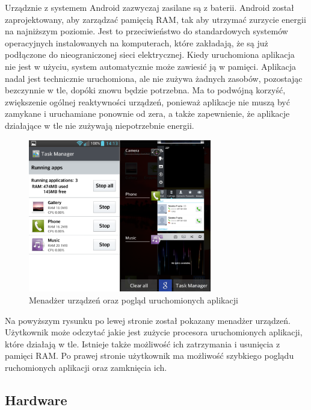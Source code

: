 Urządznie z systemem Android zazwyczaj zasilane są z baterii. Android został zaprojektowany, aby zarządzać pamięcią RAM, tak aby utrzymać zurzycie energii na najniższym poziomie. Jest to przeciwieństwo do standardowych systemów operacyjnych instalowanych na komputerach, które zakładają, że są już podłączone do nieograniczonej sieci elektrycznej. Kiedy uruchomiona aplikacja nie jest w użyciu, system automatycznie może zawiesić ją w pamięci. Aplikacja nadal jest technicznie uruchomiona, ale nie zużywa żadnych zasobów, pozostając bezczynnie w tle, dopóki znowu będzie potrzebna. Ma to podwójną korzyść, zwiększenie ogólnej reaktywności urządzeń, ponieważ aplikacje nie muszą być zamykane i uruchamiane ponownie od zera, a także zapewnienie, że aplikacje działające w tle nie zużywają niepotrzebnie energii.\cite{android:36}\cite{android:37}

\begin{figure}[H] 
\centering\includegraphics[width=8cm]{figures/android/memoryManagment}
\caption{Menadżer urządzeń oraz pogląd uruchomionych aplikacji}
\end{figure}

Na powyższym rysunku po lewej stronie został pokazany menadżer urządzeń. Użytkownik może odczytać jakie jest zużycie procesora uruchomionych aplikacji, które działają w tle. Istnieje także możliwość ich zatrzymania i usunięcia z pamięci RAM. Po prawej stronie użytkownik ma możliwość szybkiego poglądu ruchomionych aplikacji oraz zamknięcia ich.

\subsection{Hardware}


